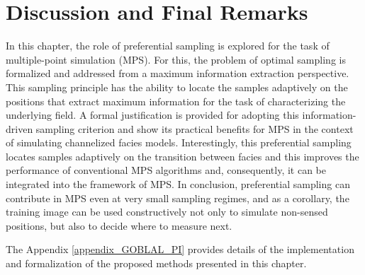 \section{Discussion and Final Remarks}
\label{sec_con_PI}
In this chapter, the role of preferential sampling is explored for the task of multiple-point simulation (MPS). For this, the problem of optimal sampling is formalized and addressed from a maximum information extraction perspective. This sampling principle has the ability to locate the samples adaptively on the positions that extract maximum information for the task of characterizing the underlying field. A formal justification is provided for adopting this information-driven sampling criterion and show its practical benefits for MPS in the context of simulating channelized facies models. Interestingly, this preferential sampling locates samples adaptively on the transition between facies and this improves the performance of conventional MPS algorithms and, consequently, it can be integrated into the framework of MPS. 
In conclusion, preferential sampling can contribute in MPS even at very small sampling regimes, and as a corollary, the training image can be used constructively not only to simulate non-sensed positions, but also to decide where to measure next.

The Appendix \ref{appendix_GOBLAL_PI} provides details of the implementation and formalization of the proposed methods presented in this chapter.
